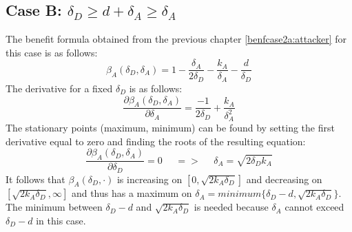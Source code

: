 \subsection*{Case B: $\delta_{D} \geq d+\delta_{A} \geq \delta_{A} $ }
The benefit formula obtained from the previous chapter \ref{benfcase2a:attacker} for this case is as follows:
\begin{equation*}
\beta_{A}(\delta_{D},\delta_{A}) =1- \dfrac{\delta_{A}}{2\delta_{D}} - \dfrac{k_{A}}{\delta_{A}} - \dfrac{d}{\delta_{D}}
\end{equation*}
The derivative for a fixed $\delta_{D}$ is as follows:
\begin{equation*}
\dfrac{\partial \beta_{A}(\delta_{D},\delta_{A})}{\partial \delta_{A}} = \dfrac{-1}{2\delta_{D}} + \dfrac{k_{A}}{\delta_{A}^{2}}
\end{equation*}
The stationary points (maximum, minimum) can be found by setting the first derivative equal to zero and finding the roots of the resulting equation:
\begin{equation*}
\frac{\partial \beta_{A}(\delta_{D},\delta_{A})}{\partial \delta_{D}} =0 ~~~~~~ =>~~~~~~ \delta_{A} = \sqrt{2\delta_{D}k_{A}}
\end{equation*}
It follows that $\beta_{A}(\delta_{D},\cdot)$ is increasing on $[0,\sqrt{2k_{A}\delta_{D}}]$ and decreasing on $[\sqrt{2k_{A}\delta_{D}}, \infty]$ and thus has a maximum on $\delta_{A} = minimum \{\delta_{D} -d, \sqrt{2k_{A}\delta_{D}} \} $. The minimum between $\delta_{D}-d$ and $ \sqrt{2k_{A}\delta_{D}}$ is needed because $\delta_{A} $ cannot exceed $\delta_{D}-d$ in this case. \\

